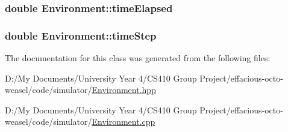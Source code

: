 \subsubsection[{\texorpdfstring{time\+Elapsed}{timeElapsed}}]{\setlength{\rightskip}{0pt plus 5cm}double Environment\+::time\+Elapsed\hspace{0.3cm}{\ttfamily [private]}}\hypertarget{class_environment_a94758a1936023963eafaa129bb84f89d}{}\label{class_environment_a94758a1936023963eafaa129bb84f89d}
\subsubsection[{\texorpdfstring{time\+Step}{timeStep}}]{\setlength{\rightskip}{0pt plus 5cm}double Environment\+::time\+Step\hspace{0.3cm}{\ttfamily [private]}}\hypertarget{class_environment_a0eac119e9f0130f836f04224612dfb16}{}\label{class_environment_a0eac119e9f0130f836f04224612dfb16}


The documentation for this class was generated from the following files\+:\begin{DoxyCompactItemize}
\item 
D\+:/\+My Documents/\+University Year 4/\+C\+S410 Group Project/effacious-\/octo-\/weasel/code/simulator/\hyperlink{_environment_8hpp}{Environment.\+hpp}\item 
D\+:/\+My Documents/\+University Year 4/\+C\+S410 Group Project/effacious-\/octo-\/weasel/code/simulator/\hyperlink{_environment_8cpp}{Environment.\+cpp}\end{DoxyCompactItemize}
